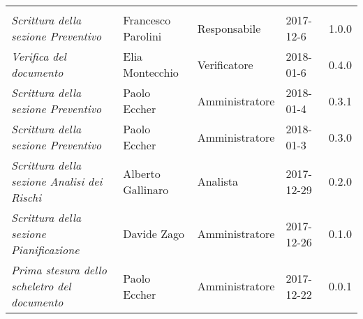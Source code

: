 \newpage 
\section*{}
\begin{table}[H]
	\centering
	\begin{tabular}{p{4cm}|C{3cm}|C{3cm}|R{2.5cm}|R{2cm}}
		
		 & & & & \\
		
		
		\emph{Scrittura della sezione Preventivo} & Francesco Parolini & Responsabile & 2017-12-6 & 1.0.0\\
		\hline
		
		\emph{Verifica del documento} & Elia Montecchio & Verificatore & 2018-01-6 & 0.4.0 \\
		\hline
		
		\emph{Scrittura della sezione Preventivo} & Paolo Eccher & Amministratore & 2018-01-4 & 0.3.1 \\
		\hline
		
		\emph{Scrittura della sezione Preventivo} & Paolo Eccher & Amministratore & 2018-01-3 & 0.3.0 \\
		\hline
		
		\emph{Scrittura della sezione Analisi dei Rischi}& Alberto Gallinaro & Analista & 2017-12-29 & 0.2.0 \\
		\hline
		
		\emph{Scrittura della sezione Pianificazione}& Davide Zago & Amministratore & 2017-12-26 & 0.1.0 \\
		\hline
		
		\emph{Prima stesura dello scheletro del documento} & Paolo Eccher & Amministratore & 2017-12-22 & 0.0.1 \\
		
	\end{tabular}
	
\end{table}


\clearpage
